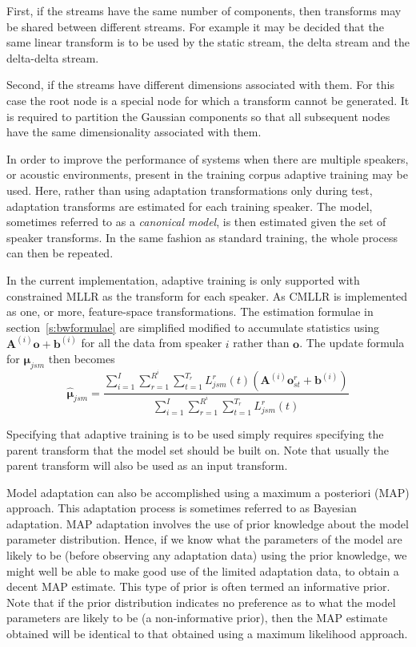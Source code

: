 First, if the streams have the same number of components, then transforms
may be shared between different streams. For example it may be decided that
the same linear transform is to be used by the static stream, the delta
stream and the delta-delta stream.

Second, if the streams have different dimensions associated with them. For
this case the root node is a special node for which a transform cannot be 
generated. It is required to partition the Gaussian components so that 
all subsequent nodes have the same dimensionality associated with them.


In order to improve the performance of systems when there are multiple
speakers, or acoustic environments, present in the training corpus 
adaptive training may be used. Here, rather than using adaptation
transformations only during test, adaptation transforms are estimated
for each training speaker. The model, sometimes referred to as a {\em canonical
model}, is then estimated given the set of speaker transforms. In the
same fashion as standard training, the whole process can then be repeated.

In the current implementation, adaptive training is only supported
with constrained MLLR as the transform for each speaker. As CMLLR is
implemented as one, or more, feature-space transformations. The
estimation formulae in section~\ref{s:bwformulae} are simplified
modified to accumulate statistics using
$\bm{A}^{(i)}\bm{o}+\bm{b}^{(i)}$ for all the data from speaker $i$
rather than $\bm{o}$. The update formula for $\bm{\mu}_{jsm}$ then
becomes
\newcommand{\satliksum}[1]{
                  \sum_{i=1}^I\sum_{r=1}^{R^i}  \sum_{t=1}^{T_r} L^r_{#1}(t)
}
\[
   \hat{\bm{\mu}}_{jsm} = \frac{
                \satliksum{jsm}(\bm{A}^{(i)}\bm{o}^r_{st}+\bm{b}^{(i)})}{\satliksum{jsm}}
\]

Specifying that adaptive training is to be used simply requires specifying
the parent transform that the model set should be built on. Note that usually
the parent transform will also be used as an input transform.


Model adaptation can also be accomplished using a maximum a
posteriori (MAP) approach. 
This adaptation process is sometimes
referred to as Bayesian adaptation. MAP adaptation involves the use 
of prior knowledge about the model parameter distribution.
Hence, if we know what the parameters of the model are
likely to be (before observing any adaptation data) using the prior
knowledge, we might well be able to make good use of the limited
adaptation data, to obtain a decent MAP estimate. This type of prior
is often termed an informative prior.
Note that if the prior
distribution indicates no preference as to what the model parameters
are likely to be (a non-informative prior), then the MAP estimate
obtained will be identical to that obtained using a maximum likelihood
approach.

